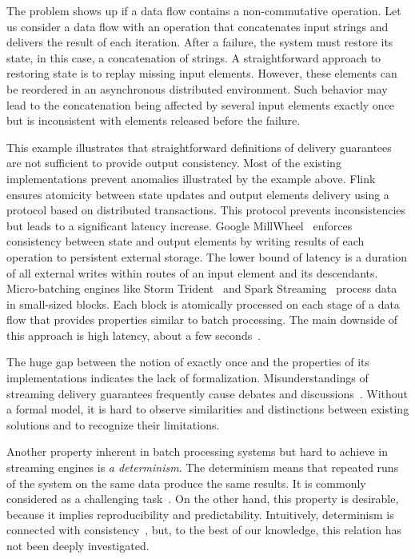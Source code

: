 The problem shows up if a data flow contains a non-commutative operation. Let us consider a data flow with an operation that concatenates input strings and delivers the result of each iteration. 
After a failure, the system must restore its state, in this case, a concatenation of strings. 
A straightforward approach to restoring state is to replay missing input elements. 
However, these elements can be reordered in an asynchronous distributed environment. 
Such behavior may lead to the concatenation being affected by several input elements exactly once but is inconsistent with elements released before the failure.

This example illustrates that straightforward definitions of delivery guarantees are not sufficient to provide output consistency. 
Most of the existing implementations prevent anomalies illustrated by the example above. Flink ensures atomicity between state updates and output elements delivery using a protocol based on distributed transactions. This protocol prevents inconsistencies but leads to a significant latency increase. 
Google MillWheel~\cite{Akidau:2013:MFS:2536222.2536229} enforces consistency between state and output elements by writing results of each operation to persistent external storage. 
The lower bound of latency is a duration of all external writes within routes of an input element and its descendants. 
Micro-batching engines like Storm Trident~\cite{apache:storm:trident} and Spark Streaming~\cite{Zaharia:2012:DSE:2342763.2342773} process data in small-sized blocks. 
Each block is atomically processed on each stage of a data flow that provides properties similar to batch processing.
 The main downside of this approach is high latency, about a few seconds~\cite{7530084, 7474816}.

The huge gap between the notion of exactly once and the properties of its implementations indicates the lack of formalization. Misunderstandings of streaming delivery guarantees frequently cause debates and discussions~\cite{JerryPengStreamIO, PaperTrail}. Without a formal model, it is hard to observe similarities and distinctions between existing solutions and to recognize their limitations.

Another property inherent in batch processing systems but hard to achieve in streaming engines is {\em a determinism}. 
The determinism means that repeated runs of the system on the same data produce the same results. It is commonly considered as a challenging task~\cite{Zacheilas:2017:MDS:3093742.3093921}. 
On the other hand, this property is desirable, because it implies reproducibility and predictability. 
Intuitively, determinism is connected with consistency~\cite{Stonebraker:2005:RRS:1107499.1107504}, but, to the best of our knowledge, this relation has not been deeply investigated. 

